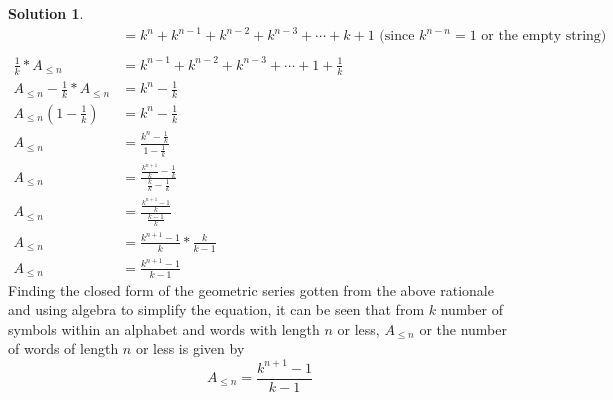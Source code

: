 \documentclass{article}
\theoremstyle{definition}
\newtheorem*{solution}{Solution}
\begin{document}
\begin{solution}
\begin{align*}
&=k^n + k^{n-1} + k^{n-2}+ k^{n-3}+ \cdots + k + 1 \mbox{ (since $k^{n-n} = 1$ or the empty string)}\\\\
\frac{1}{k} * A_{\leqslant n} &= k^{n-1} + k^{n-2} + k^{n-3} + \cdots + 1 + \frac{1}{k}\\
A_{\leqslant n} - \frac{1}{k} * A_{\leqslant n} &= k^n - \frac{1}{k}\\
A_{\leqslant n}(1 - \frac{1}{k}) &= k^n - \frac{1}{k}\\
A_{\leqslant n} &= \frac{k^n - \frac{1}{k}}{1-\frac{1}{k}}\\
A_{\leqslant n} &= \frac{\frac{k^{n+1}}{k} - \frac{1}{k}}{\frac{k}{k}-\frac{1}{k}}\\
A_{\leqslant n} &= \frac{\frac{k^{n+1}-1}{k}}{\frac{k-1}{k}}\\
A_{\leqslant n} &= \frac{k^{n+1}-1}{k} * \frac{k}{k-1}\\
A_{\leqslant n} &= \frac{k^{n+1}-1}{k-1}
\end{align*}
Finding the closed form of the geometric series gotten from the above rationale and using algebra to simplify the equation, it can be seen that from $k$ number of symbols within an alphabet and words with length $n$ or less, $A_{\leqslant n}$ or the number of words of length $n$ or less is given by
$$ A_{\leqslant n} = \frac{k^{n+1}-1}{k-1} $$
\end{solution}
\end{document}
